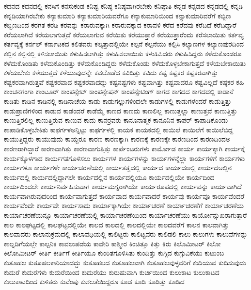 {ಕದನದ
ಕದನದಲ್ಲಿ
ಕನಸಿಗೆ
ಕನಸುಕಂಡ
ಕನಿಷ್ಟ
ಕನಿಷ್ಠ
ಕನಿಷ್ಠವಾಗಿರಬೇಕು
ಕನಿಷ್ಠಾತಿ
ಕನ್ನಡ
ಕನ್ನಡದ
ಕನ್ನಡದಲ್ಲಿ
ಕನ್ನಡಿ
ಕನ್ನಡಿಯಾಗಿರಬೇಕು
ಕನ್ಯಾಕುಮಾರಿ
ಕನ್ಯಾಕುಮಾರಿಯವರೆಗೂ
ಕನ್ಯಾಕುಮಾರಿಯಿಂದ
ಕನ್ಯಾಕುಮಾರಿವರೆಗೆ
ಕಬ್ಬಿಣ
ಕಬ್ಬಿಣದಿಂದ
ಕರಗತ
ಕರಡಿ
ಕರವನ್ನು
ಕರಾರುವಕ್ಕಾಗಿ
ಕರಾರುವಕ್ಕಾದ
ಕರಾವಳಿ
ಕರೆದ
ಕರೆದವು
ಕರೆದಿದೆ
ಕರೆದಿದ್ದಾರೆ
ಕರೆಯಲಾಗಿದೆ
ಕರೆಯಲಾಗುತ್ತದೆ
ಕರೆಯಲಾಗುವ
ಕರೆಯಿತು
ಕರೆಯುತ್ತಾರೆ
ಕರೆಯುತ್ತಾರೆಂದು
ಕರೆಸಲಾಯಿತು
ಕರ್ತವ್ಯ
ಕರ್ತವ್ಯಕ್ಕೆ
ಕರ್ನಲ್
ಕರ್ನಾಟಕದ
ಕಲಿತವರು
ಕಲ್ಕತ್ತಾದಲ್ಲಿಯೇ
ಕಲ್ಪನೆ
ಕಲ್ಪನೆಯು
ಕಲ್ಪಿಸಿ
ಕಲ್ಯಾಣಗಳ
ಕಲ್ಯಾಣಪುರದಿಂದ
ಕಲ್ಲಿನ
ಕಲ್ಲಿನಲ್ಲಿ
ಕಳಿಸಲಾಯಿತು
ಕಳುಹಿಸಲಾಗಿತ್ತು
ಕಳುಹಿಸಲಾಯಿತು
ಕಳುಹಿಸಿದರು
ಕಳುಹಿಸಿದ್ದರು
ಕಳೆದುಕೊಂಡರೂ
ಕಳೆದುಕೊಂಡಿತು
ಕಳೆದುಕೊಂಡಿತ್ತು
ಕಳೆದುಕೊಂಡಿದ್ದರು
ಕಳೆದುಕೊಂಡು
ಕಳೆದುಕೊಳ್ಳಬೇಕಾಗುತ್ತದೆ
ಕಳೆಯಬೇಕಾಯಿತು
ಕಳೆಯಬೇಕು
ಕಳೆಯುತ್ತದೆ
ಕಳೆಯುವುದನ್ನೇ
ಕವಲೊಡೆದ
ಕವಿದಿತ್ತು
ಕವಿದು
ಕಷ್ಟ
ಕಷ್ಟಕರ
ಕಷ್ಟಕರವಾಗಿತ್ತು
ಕಷ್ಟಕರವಾಗಿರುತ್ತವೆ
ಕಷ್ಟಕರವಾದ
ಕಷ್ಟಕರವಾದದ್ದು
ಕಷ್ಟನಷ್ಟಗಳು
ಕಷ್ಟವಾಗಿತ್ತು
ಕಷ್ಟವಾದರೂ
ಕಷ್ಟವಿಲ್ಲದೆ
ಕಷ್ಠಕರ
ಕಹಿ
ಕಾಂಚನಗಂಗಾ
ಕಾಂಟೂರ್
ಕಾಂಪನ್ಸೇಟ್
ಕಾಂಪನ್ಸೇಷನ್
ಕಾಂಪೆನ್ಸೇಟಿಂಗ್
ಕಾಗದ
ಕಾಗದದ
ಕಾಗದದಲ್ಲಿ
ಕಾಡಾನೆ
ಕಾಡಿತು
ಕಾಡಿನ
ಕಾಡಿನಲ್ಲಿ
ಕಾಡಿನಾಚೆಯ
ಕಾಡು
ಕಾಡುಗಲ್ಲುಗಳಿಂದಲೇ
ಕಾಡುಗಳಲ್ಲಿ
ಕಾಡುಗಳೆಂದರೆ
ಕಾಡುತ್ತಿತ್ತು
ಕಾಡುಪ್ರಾಣಿಗಳಿಂದ
ಕಾಡುವ
ಕಾಡೆಂದರೆ
ಕಾಡೆಮ್ಮೆ
ಕಾಣದ
ಕಾಣದು
ಕಾಣಲಿಲ್ಲ
ಕಾಣುತ್ತಲ್ಲಾ
ಕಾಣುತ್ತವೆ
ಕಾಣುತ್ತಿತ್ತು
ಕಾಣುತ್ತಿರಲಿಲ್ಲ
ಕಾಣುತ್ತಿರುವ
ಕಾಣುವ
ಕಾದು
ಕಾನರ್ರವರು
ಕಾನೂನಾತ್ಮಕ
ಕಾನೂನಿನ
ಕಾಪರ್
ಕಾಪಾಡಿಕೊಂಡು
ಕಾಪಾಡಿಕೊಳ್ಳಬೇಕಿತು
ಕಾಫರ್ಗಳಅನ್ನಿಟ್ಟು
ಕಾಫರ್ಗಳಲ್ಲಿ
ಕಾಯಕ
ಕಾಯಕದಲ್ಲಿ
ಕಾಯಿಲೆ
ಕಾಯಿಲೆಗೆ
ಕಾಯಿಲೆಬಿದ್ದ
ಕಾಯುತ್ತಿದ್ದರು
ಕಾಯುವುದು
ಕಾಯ್ದರೂ
ಕಾರಣ
ಕಾರಣಕ್ಕಾಗಿ
ಕಾರಣಕ್ಕೆ
ಕಾರಣಕ್ಕೇ
ಕಾರಣದಿಂದ
ಕಾರಣದಿಂದಅ
ಕಾರಣರಾಗಿದ್ದಾರೆ
ಕಾರಣವಾಗಿತ್ತು
ಕಾರಣವಾಗುತ್ತಿತ್ತು
ಕಾರ್ಪೆಂಟರುಗಳು
ಕಾರ್ಮೋಡ
ಕಾರ್ಯ
ಕಾರ್ಯಕ್ಕಾಗಿ
ಕಾರ್ಯಕ್ಕೆ
ಕಾರ್ಯಕ್ಕೊಳಗಾದ
ಕಾರ್ಯಗತಗೊಳಿಸಲು
ಕಾರ್ಯಗಳ
ಕಾರ್ಯಗಳನ್ನು
ಕಾರ್ಯಗಳನ್ನೆಲ್ಲಾ
ಕಾರ್ಯಗಳಿಗೆ
ಕಾರ್ಯಗಳು
ಕಾರ್ಯಗಳೂ
ಕಾರ್ಯಗಳೇ
ಕಾರ್ಯಚರಣೆಯಲ್ಲಿ
ಕಾರ್ಯತತ್ವದಲ್ಲಿ
ಕಾರ್ಯದ
ಕಾರ್ಯದಅಲ್ಲಿ
ಕಾರ್ಯದಅಲ್ಲಿನ
ಕಾರ್ಯದಲ್ಲಿ
ಕಾರ್ಯದಲ್ಲಿದ್ದಾಗಲೇ
ಕಾರ್ಯದಲ್ಲಿನ
ಕಾರ್ಯದಲ್ಲಿಯೂ
ಕಾರ್ಯದಲ್ಲಿಯೇ
ಕಾರ್ಯದಿಂದ
ಕಾರ್ಯದಿಂದಲೇ
ಕಾರ್ಯನಿರ್ವಹಿಸುವಾಗ
ಕಾರ್ಯಮಗ್ನರಾಗಿಯೇ
ಕಾರ್ಯರೂಪದಲ್ಲಿ
ಕಾರ್ಯವನ್ನು
ಕಾರ್ಯವಾಗಿದೆ
ಕಾರ್ಯವಾಗಿರುವುದರಿಂದ
ಕಾರ್ಯವಾಗುತ್ತದೆ
ಕಾರ್ಯವಾದ
ಕಾರ್ಯವಾದರೆ
ಕಾರ್ಯವು
ಕಾರ್ಯವೂ
ಕಾರ್ಯವೆಂದರೆ
ಕಾರ್ಯವೆಂದೇ
ಕಾರ್ಯವೇ
ಕಾರ್ಯಸಾದು
ಕಾರ್ಯಾಕ್ಕಾಗಿಯೇ
ಕಾರ್ಯಾಚರಣೆ
ಕಾರ್ಯಾಚರಣೆಗೆ
ಕಾರ್ಯಾಚರಣೆಯ
ಕಾರ್ಯಾಚರಣೆಯನ್ನೂ
ಕಾರ್ಯಾಚರಣೆಯಲ್ಲಿ
ಕಾರ್ಯಾಚರಣೆಯಿಂದ
ಕಾರ್ಯಾಚರಣೆಯು
ಕಾರ್ಯೋನ್ನುಖರಾಗುತ್ತಾರೆ
ಕಾಲ
ಕಾಲಘಟ್ಟದಲ್ಲಿ
ಕಾಲಘಟ್ಟದಲ್ಲಿಯೇ
ಕಾಲದ
ಕಾಲದಲ್ಲಿ
ಕಾಲದಲ್ಲಿಯೇ
ಕಾಲದವರೆಗೆ
ಕಾಲನ
ಕಾಲವಾಗಿತ್ತು
ಕಾಲವಾದರು
ಕಾಲಾನುಕ್ರಮದಲ್ಲಿ
ಕಾಲಾವಧಿಯಲ್ಲಿ
ಕಾಲಿಟ್ಟರು
ಕಾಲಿಟ್ಟವರು
ಕಾಲಿಡಲಿ
ಕಾಲು
ಕಾಲುಗಳು
ಕಾಲುವೆಗಳನ್ನು
ಕಾಲ್ನಡಿಗೆಯಲ್ಲೇ
ಕಾಲ್ಪನಿಕ
ಕಾವಲುಪಡೆಯ
ಕಾವೇರಿ
ಕಾಶ್ಮೀರ
ಕಿಂಚಿತ್ತೂ
ಕಿತ್ತು
ಕಿರು
ಕಿಲೊಮೀಟರ್
ಕಿಲೋ
ಕಿಲೋಮೀಟರ್
ಕೀರ್ತಿ
ಕೀರ್ತಿಗೆ
ಕೀರ್ತಿಯೂ
ಕುಂಠಿತಗೊಳಿಸಿತು
ಕುಂದಿತ್ತು
ಕುಗ್ಗಿದ
ಕುಗ್ಗುವಿಕೆಯು
ಕುಟುಂಬ
ಕುತೂಹಲ
ಕುತೂಹಲಕಾರಿಯಾದದ್ದು
ಕುತೂಹಲದ
ಕುತೂಹಲವಾಗಿ
ಕುತೂಹಲವುಳ್ಳವರಿಗೆ
ಕುದಿಯುವ
ಕುದಿಸುವುದು
ಕುದುರೆ
ಕುದುರೆಗಳು
ಕುದುರೆಯಿಂದ
ಕುದುರೆಯು
ಕುರುಹುವಾಗಿ
ಕುರ್ಚಿಯಿಂದ
ಕುಲುಕಾಟ
ಕುಲುಕಾಟದ
ಕುಲುಕಾಟದಿಂದ
ಕುಳಿತರು
ಕುವೆಂಪು
ಕುಶಲತೆಯಿದ್ದರೂ
ಕೂಡ
ಕೂಡಿ
ಕೂಡಿತ್ತು
ಕೂಡಿದ
}
